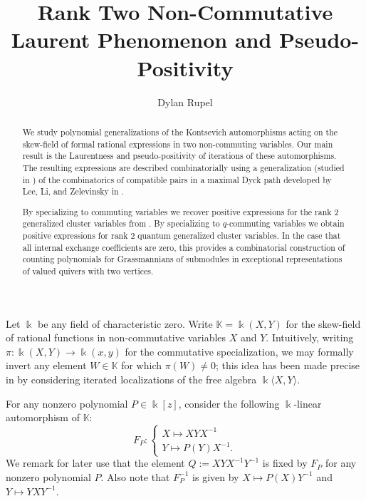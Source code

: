 \documentclass{amsart}
\title{Rank Two Non-Commutative Laurent Phenomenon and Pseudo-Positivity}
\author{Dylan Rupel}
\newcommand{\kk}{\Bbbk}
\newcommand{\KK}{\mathbb{K}}
\begin{document}
 \begin{abstract}
  We study polynomial generalizations of the Kontsevich automorphisms acting on the skew-field of formal rational expressions in two non-commuting variables.  Our main result is the Laurentness and pseudo-positivity of iterations of these automorphisms.  The resulting expressions are described combinatorially using a generalization (studied in \cite{rupel2}) of the combinatorics of compatible pairs in a maximal Dyck path developed by Lee, Li, and Zelevinsky in \cite{lee-li-zelevinsky}.  

  By specializing to commuting variables we recover positive expressions for the rank 2 generalized cluster variables from \cite{rupel2}.  By specializing to $q$-commuting variables we obtain positive expressions for rank 2 quantum generalized cluster variables.  In the case that all internal exchange coefficients are zero, this provides a combinatorial construction of counting polynomials for Grassmannians of submodules in exceptional representations of valued quivers with two vertices.
 \end{abstract}
 \maketitle


\setcounter{section}{1}

Let $\kk$ be any field of characteristic zero.  Write $\KK=\kk(X,Y)$ for the skew-field of rational functions in non-commutative variables $X$ and $Y$.  Intuitively, writing $\pi:\kk(X,Y)\to\kk(x,y)$ for the commutative specialization, we may formally invert any element $W\in\KK$ for which $\pi(W)\ne0$; this idea has been made precise in \cite{usnich1} by considering iterated localizations of the free algebra $\kk\langle X,Y\rangle$.

For any nonzero polynomial $P\in\kk[z]$, consider the following $\kk$-linear automorphism of $\KK$:
\[F_P:\begin{cases} X\mapsto XYX^{-1}\\ Y\mapsto P(Y)X^{-1}.\end{cases}\]
We remark for later use that the element $Q:=XYX^{-1}Y^{-1}$ is fixed by $F_P$ for any nonzero polynomial $P$.  Also note that $F_P^{-1}$ is given by $X\mapsto P(X)Y^{-1}$ and $Y\mapsto YXY^{-1}$.
\end{document}
